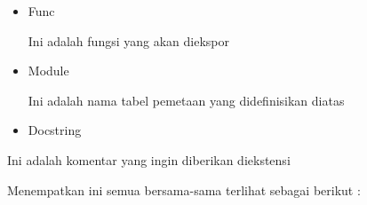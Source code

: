 \documentclass{wileySix}
\begin{document}
\begin{myEnumerate}
\begin{myEnumerate}
{\begin{myEnumerate}
\begin{itemize}
	\noindent 
	~~  $  \{  $ "\textit{func}", (PyCFunction)\textit{module $  \_  $func}, METH $  \_  $NOARGS, NULL  $  \}  $, \par
	\noindent 
	~~  $  \{  $ NULL, NULL, 0, NULL  $  \}  $ \par
	\noindent 
	$  \}  $; \par
	\vspace{12pt}
	\noindent 
	\hspace*{0.5in} Bagian terakhir dari modul ekstensi adalah fungsi inialisasi. Fungsi ini dipanggil oleh juru bahasa Python saat modul diisikan. Hal ini diperlukan agar fungsi diberi nama intiModule dimana modul adalah nama modul. \par
	\noindent 
	\hspace*{0.5in} Fungsi inialisasi perlu diekspor dari perpustakaan yang akan dibangun. Header Python mendefinisikan PyMODINIT $  \_  $Func untuk memasukkan mantra yang sesuai agar terjadi pada lingkungan tertentu tempat menyuusun. Yang harus dilakukan adalah mengunakan saat menentukan fungsinya. \par
	\noindent 
	\hspace*{0.5in} Fungsi inialisasi C umumnya memiliki strktur keseluruhan berikut : \par
	\noindent 
	PyMODINIT $  \_  $FUNC init\textit{Module}()  $  \{  $ \par
	\noindent 
	~~ Py $  \_  $InitModule3(\textit{func}, \textit{module} $  \_  $methods, "docstring..."); \par
	\noindent 
	$  \}  $ \par
	\vspace{12pt}
	\noindent 
	Berikut adalah penjelasan fugsi Py $  \_  $IntiModule : \par
	\noindent 
	\item Func  \par
	\noindent 
	Ini adalah fungsi yang akan diekspor \par
	\noindent 
	\item Module \par
	\noindent 
	Ini adalah nama tabel pemetaan yang didefinisikan diatas \par
	\noindent 
	\item Docstring\end{itemize}
\par
\noindent 
Ini adalah komentar yang ingin diberikan diekstensi \par
\vspace{12pt}
\noindent 
\hspace*{0.5in} Menempatkan ini semua bersama-sama terlihat sebagai berikut : \par

\end{myEnumerate}}
\end{myEnumerate}
\end{myEnumerate}
\end{document}
